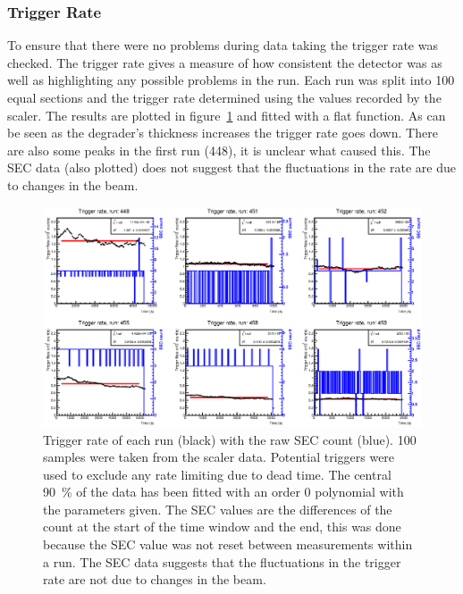 \subsubsection{Trigger Rate} %
\label{sub:gain_stability}
To ensure that there were no problems during data taking the trigger rate was checked. The trigger rate gives a measure of how consistent the detector was as well as highlighting any possible problems in the run. Each run was split into 100 equal sections and the trigger rate determined using the values recorded by the scaler. The results are plotted in figure~\ref{fig:gain_stability} and fitted with a flat function. As can be seen as the degrader's thickness increases the trigger rate goes down. There are also some peaks in the first run (448), it is unclear what caused this. The SEC data (also plotted) does not suggest that the fluctuations in the rate are due to changes in the beam. 
%
\begin{figure}
      \centering
          \includegraphics[width=\textwidth]{images/momentum_spectrum/gain_stability.eps}
      \caption{Trigger rate of each run (black) with the raw SEC count (blue). 100 samples were taken from the scaler data. Potential triggers were used to exclude any rate limiting due to dead time. The central 90~\% of the data has been fitted with an order 0 polynomial with the parameters given. The SEC values are the differences of the count at the start of the time window and the end, this was done because the SEC value was not reset between measurements within a run. The SEC data suggests that the fluctuations in the trigger rate are not due to changes in the beam.}
      \label{fig:gain_stability}
\end{figure}

